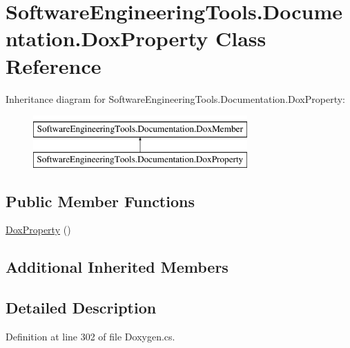 \hypertarget{class_software_engineering_tools_1_1_documentation_1_1_dox_property}{\section{Software\+Engineering\+Tools.\+Documentation.\+Dox\+Property Class Reference}
\label{class_software_engineering_tools_1_1_documentation_1_1_dox_property}
}
Inheritance diagram for Software\+Engineering\+Tools.\+Documentation.\+Dox\+Property\+:\begin{figure}[H]
\begin{center}
\leavevmode
\includegraphics[height=2.000000cm]{class_software_engineering_tools_1_1_documentation_1_1_dox_property}
\end{center}
\end{figure}
\subsection*{Public Member Functions}
\begin{DoxyCompactItemize}
\item 
\hyperlink{class_software_engineering_tools_1_1_documentation_1_1_dox_property_a4e2e03fabd61a3f9a278ded098304dab}{Dox\+Property} ()
\end{DoxyCompactItemize}
\subsection*{Additional Inherited Members}


\subsection{Detailed Description}


Definition at line 302 of file Doxygen.\+cs.




